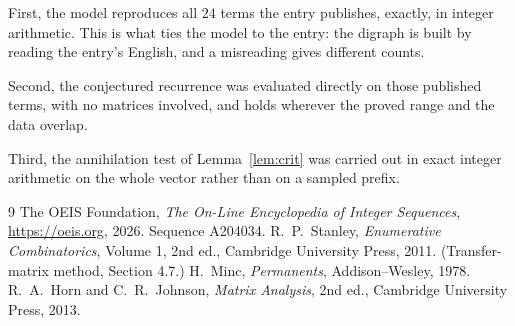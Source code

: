 \documentclass[11pt,a4paper]{article}
\theoremstyle{plain}
\theoremstyle{definition}
\begin{document}
First, the model reproduces all $24$ terms the entry publishes, exactly, in integer
arithmetic. This is what ties the model to the entry: the digraph is built by reading the
entry's English, and a misreading gives different counts.

Second, the conjectured recurrence was evaluated directly on those published terms, with no
matrices involved, and holds wherever the proved range and the data overlap.

Third, the annihilation test of Lemma~\ref{lem:crit} was carried out in exact integer
arithmetic on the whole vector rather than on a sampled prefix.

\begin{thebibliography}{9}
 The OEIS Foundation, \emph{The On-Line Encyclopedia of Integer
Sequences}, \url{https://oeis.org}, 2026. Sequence A204034.
 R.~P.~Stanley, \emph{Enumerative Combinatorics}, Volume 1, 2nd ed.,
Cambridge University Press, 2011. (Transfer-matrix method, Section 4.7.)
 H.~Minc, \emph{Permanents}, Addison--Wesley, 1978.
 R.~A.~Horn and C.~R.~Johnson, \emph{Matrix Analysis}, 2nd ed., Cambridge
University Press, 2013.
\end{thebibliography}
\end{document}
